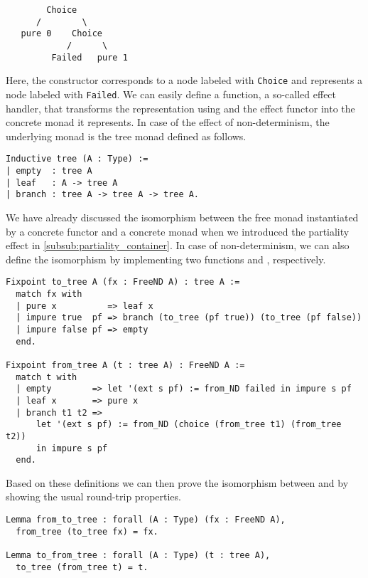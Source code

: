 \begin{verbatim}
        Choice
      /        \
   pure 0    Choice
            /      \
         Failed   pure 1
\end{verbatim}

Here, the constructor  corresponds to a node labeled with \texttt{Choice} and  represents a node labeled with \texttt{Failed}.
We can easily define a function, a so-called effect handler, that transforms the representation using  and the effect functor into the concrete monad it represents.
In case of the effect of non-determinism, the underlying monad is the tree monad defined as follows.

\begin{verbatim}
Inductive tree (A : Type) :=
| empty  : tree A
| leaf   : A -> tree A
| branch : tree A -> tree A -> tree A.
\end{verbatim}

We have already discussed the isomorphism between the free monad instantiated by a concrete functor and a concrete monad when we introduced the partiality effect in \autoref{subsub:partiality_container}.
In case of non-determinism, we can also define the isomorphism by implementing two functions  and , respectively.

\begin{verbatim}
Fixpoint to_tree A (fx : FreeND A) : tree A :=
  match fx with
  | pure x          => leaf x
  | impure true  pf => branch (to_tree (pf true)) (to_tree (pf false))
  | impure false pf => empty
  end.

Fixpoint from_tree A (t : tree A) : FreeND A :=
  match t with
  | empty        => let '(ext s pf) := from_ND failed in impure s pf
  | leaf x       => pure x
  | branch t1 t2 =>
      let '(ext s pf) := from_ND (choice (from_tree t1) (from_tree t2))
      in impure s pf
  end.
\end{verbatim}

Based on these definitions we can then prove the isomorphism between  and  by showing the usual round-trip properties.

\begin{verbatim}
Lemma from_to_tree : forall (A : Type) (fx : FreeND A),
  from_tree (to_tree fx) = fx.

Lemma to_from_tree : forall (A : Type) (t : tree A),
  to_tree (from_tree t) = t.
\end{verbatim}

